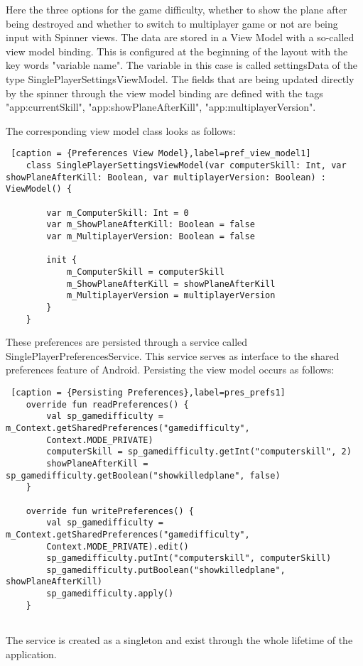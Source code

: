 Here the three options for the game difficulty, whether to show the plane after being destroyed and whether to switch to multiplayer game or not are being input with Spinner views. The data are stored in a View Model with a so-called view model binding. This is configured at the beginning of the layout with the key words "variable name". The variable in this case is called settingsData of the type SinglePlayerSettingsViewModel. The fields that are being updated directly by the spinner through the view model binding are defined with the tags "app:currentSkill", "app:showPlaneAfterKill", "app:multiplayerVersion". 

The corresponding view model class looks as follows:

\begin{lstlisting} [caption = {Preferences View Model},label=pref_view_model1]
	class SinglePlayerSettingsViewModel(var computerSkill: Int, var showPlaneAfterKill: Boolean, var multiplayerVersion: Boolean) : ViewModel() {
		
		var m_ComputerSkill: Int = 0
		var m_ShowPlaneAfterKill: Boolean = false
		var m_MultiplayerVersion: Boolean = false
		
		init {
			m_ComputerSkill = computerSkill
			m_ShowPlaneAfterKill = showPlaneAfterKill
			m_MultiplayerVersion = multiplayerVersion
		}
	}
\end{lstlisting}

These preferences are persisted through a service called SinglePlayerPreferencesService. This service serves as interface to the shared preferences feature of Android. Persisting the view model occurs as follows:

\begin{lstlisting} [caption = {Persisting Preferences},label=pres_prefs1]
	override fun readPreferences() {
		val sp_gamedifficulty = m_Context.getSharedPreferences("gamedifficulty",
		Context.MODE_PRIVATE)
		computerSkill = sp_gamedifficulty.getInt("computerskill", 2)
		showPlaneAfterKill = sp_gamedifficulty.getBoolean("showkilledplane", false)
	}
	
	override fun writePreferences() {
		val sp_gamedifficulty = m_Context.getSharedPreferences("gamedifficulty",
		Context.MODE_PRIVATE).edit()
		sp_gamedifficulty.putInt("computerskill", computerSkill)
		sp_gamedifficulty.putBoolean("showkilledplane", showPlaneAfterKill)
		sp_gamedifficulty.apply()
	}
	
\end{lstlisting}

The service is created as a singleton and exist through the whole lifetime of the application.

